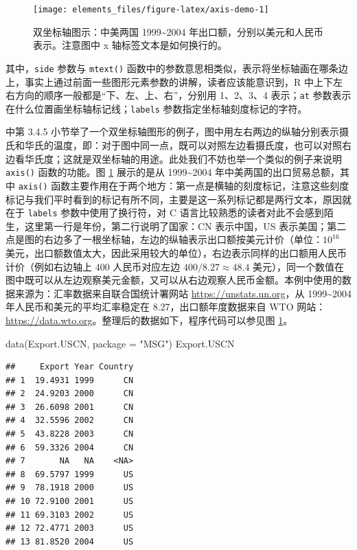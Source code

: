 \documentclass[
  b5paper,
  UTF8,twoside]{book}
\newenvironment{Shaded}{\begin{snugshade}}{\end{snugshade}}
\newcommand{\AttributeTok}[1]{\textcolor[rgb]{0.77,0.63,0.00}{#1}}
\newcommand{\FunctionTok}[1]{\textcolor[rgb]{0.00,0.00,0.00}{#1}}
\newcommand{\NormalTok}[1]{#1}
\newcommand{\StringTok}[1]{\textcolor[rgb]{0.31,0.60,0.02}{#1}}
\begin{document}
\begin{figure}

{\centering \texttt{[image: elements\_files/figure-latex/axis-demo-1]} 

}

\caption[中美出口额双坐标轴图示]{双坐标轴图示：中美两国 1999\textasciitilde2004 年出口额，分别以美元和人民币表示。注意图中 x 轴标签文本是如何换行的。}\label{fig:axis-demo}
\end{figure}



其中，\texttt{side} 参数与 \texttt{mtext()} 函数中的参数意思相类似，表示将坐标轴画在哪条边上，事实上通过前面一些图形元素参数的讲解，读者应该能意识到，R 中上下左右方向的顺序一般都是``下、左、上、右''，分别用 1、2、3、4 表示；\texttt{at} 参数表示在什么位置画坐标轴标记线；\texttt{labels} 参数指定坐标轴刻度标记的字符。

\citet{Murrell05} 中第 3.4.5 小节举了一个双坐标轴图形的例子，图中用左右两边的纵轴分别表示摄氏和华氏的温度，即：对于图中同一点，既可以对照左边看摄氏度，也可以对照右边看华氏度；这就是双坐标轴的用途。此处我们不妨也举一个类似的例子来说明 \texttt{axis()} 函数的功能。图 \ref{fig:axis-demo} 展示的是从 1999\textasciitilde2004 年中美两国的出口贸易总额，其中 \texttt{axis()} 函数主要作用在于两个地方：第一点是横轴的刻度标记，注意这些刻度标记与我们平时看到的标记有所不同，主要是这一系列标记都是两行文本，原因就在于 \texttt{labels} 参数中使用了换行符，对 C 语言比较熟悉的读者对此不会感到陌生，这里第一行是年份，第二行说明了国家：CN 表示中国，US 表示美国；第二点是图的右边多了一根坐标轴，左边的纵轴表示出口额按美元计价（单位：\(10^{16}\) 美元，出口额数值太大，因此采用较大的单位），右边表示同样的出口额用人民币计价（例如右边轴上 400 人民币对应左边 \(400/8.27\approx48.4\) 美元），同一个数值在图中既可以从左边观察美元金额，又可以从右边观察人民币金额。本例中使用的数据来源为：汇率数据来自联合国统计署网站 \url{https://unstats.un.org}，从 1999\textasciitilde2004 年人民币和美元的平均汇率稳定在 8.27，出口额年度数据来自 WTO 网站：\url{https://data.wto.org}。整理后的数据如下，程序代码可以参见图 \ref{fig:axis-demo}。

\begin{Shaded}
\begin{Highlighting}[]
\FunctionTok{data}\NormalTok{(Export.USCN, }\AttributeTok{package =} \StringTok{"MSG"}\NormalTok{)}
\NormalTok{Export.USCN}
\end{Highlighting}
\end{Shaded}

\begin{verbatim}
##     Export Year Country
## 1  19.4931 1999      CN
## 2  24.9203 2000      CN
## 3  26.6098 2001      CN
## 4  32.5596 2002      CN
## 5  43.8228 2003      CN
## 6  59.3326 2004      CN
## 7       NA   NA    <NA>
## 8  69.5797 1999      US
## 9  78.1918 2000      US
## 10 72.9100 2001      US
## 11 69.3103 2002      US
## 12 72.4771 2003      US
## 13 81.8520 2004      US
\end{verbatim}
\end{document}

